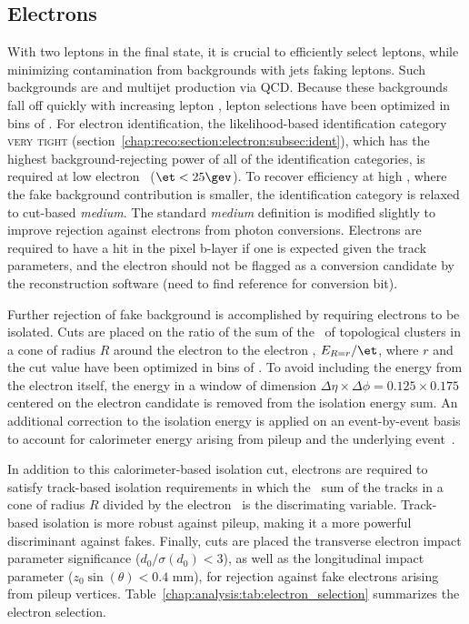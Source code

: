 
\subsection{Electrons}
\label{chap:analysis:sec:objects:subsec:electrons}

With two leptons in the final state, it is crucial to efficiently
select leptons, while minimizing contamination from backgrounds with
jets faking leptons. Such backgrounds are \wjets and multijet production
via QCD. Because these backgrounds fall off quickly with increasing
lepton \pt, lepton selections have been optimized in bins of \pt. For
electron identification, the likelihood-based identification category
\textsc{very tight}
(section~\ref{chap:reco:section:electron:subsec:ident}), which has the
highest background-rejecting power of all of the identification
categories, is required at low electron \et~($\et < 25 \gev$). To
recover efficiency at high \et, where the fake background
contribution is smaller, the identification category is relaxed to
cut-based {\it medium}. The standard {\it medium} definition is
modified slightly to improve rejection against electrons from photon
conversions. Electrons are required to have a hit in the pixel b-layer
if one is expected given the track parameters, and the electron should
not be flagged as a conversion candidate by the reconstruction
software (need to find reference for conversion bit). 

Further rejection of fake background is accomplished by requiring
electrons to be isolated. Cuts are placed on the ratio of the sum of
the \et~of topological clusters in a
cone of radius $R$ around the electron to the electron \et,
$E_{R=r}/\et$, where $r$ and the cut value have been optimized in bins
of \et. To avoid including the energy from the electron itself, the
energy in a window of dimension $\Delta \eta \times \Delta \phi =
0.125 \times 0.175$ centered on the electron candidate is removed from
the isolation energy sum. An additional correction to the isolation
energy is applied on an event-by-event basis to account for
calorimeter energy arising from pileup and the underlying
event~\cite{bib:Cacciari:2007fd}.

In addition to this calorimeter-based
isolation cut, electrons are required to satisfy track-based isolation
requirements in which
the \pt~sum of the tracks in a cone of radius $R$ divided by the
electron \et~is the discrimating variable. Track-based isolation is
more robust against pileup, making it a more powerful discriminant
against fakes. Finally, cuts are placed the transverse
electron impact parameter significance ($d_0/\sigma (d_0) < 3$), as well as the
longitudinal impact parameter ($z_0\sin(\theta) < 0.4$ mm), for
rejection against fake electrons arising from pileup
vertices. Table~\ref{chap:analysis:tab:electron_selection} summarizes
the electron selection.

